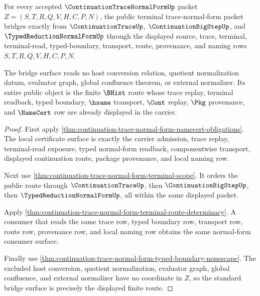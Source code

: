 \begin{theorem}
\label{thm:continuation-trace-normal-form-standard-bridge-surface}
For every accepted $\ContinuationTraceNormalFormUp$ packet $Z=(S,T,R,Q,V,H,C,P,N)$, the public terminal trace-normal-form packet bridges exactly from $\ContinuationTraceUp$, $\ContinuationBigStepUp$, and $\TypedReductionNormalFormUp$ through the displayed source, trace, terminal, terminal-read, typed-boundary, transport, route, provenance, and naming rows $S,T,R,Q,V,H,C,P,N$.

The bridge surface reads no host conversion relation, quotient normalization datum, evaluator graph, global confluence theorem, or external normalizer. Its entire public object is the finite $\BHist$ route whose trace replay, terminal readback, typed boundary, $\hsame$ transport, $\Cont$ replay, $\Pkg$ provenance, and $\NameCert$ row are already displayed in the carrier.
\end{theorem}
\begin{proof}
First apply \autoref{thm:continuation-trace-normal-form-namecert-obligations}. The local certificate surface is exactly the carrier admission, trace replay, terminal-read exposure, typed normal-form readback, componentwise transport, displayed continuation route, package provenance, and local naming row.

Next use \autoref{thm:continuation-trace-normal-form-terminal-scope}. It orders the public route through $\ContinuationTraceUp$, then $\ContinuationBigStepUp$, then $\TypedReductionNormalFormUp$, all within the same displayed packet.

Apply \autoref{thm:continuation-trace-normal-form-terminal-route-determinacy}. A consumer that reads the same trace row, typed boundary row, transport row, route row, provenance row, and local naming row obtains the same normal-form consumer surface.

Finally use \autoref{thm:continuation-trace-normal-form-typed-boundary-nonescape}. The excluded host conversion, quotient normalization, evaluator graph, global confluence, and external normalizer have no coordinate in $Z$, so the standard bridge surface is precisely the displayed finite route.
\end{proof}

